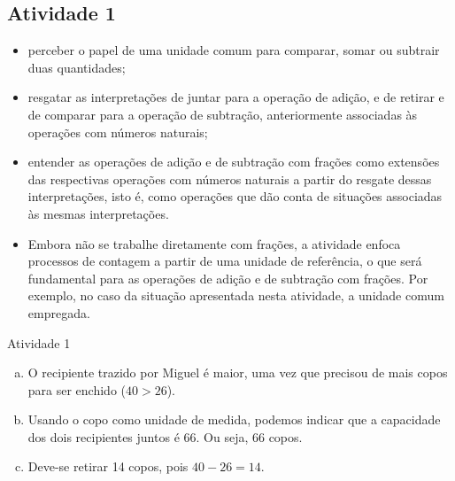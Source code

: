   \begin{multicols}{2}

\subsection{Atividade 1}

\vspace{.15cm}

\begin{itemize} %
  \item     perceber o papel de uma unidade comum para comparar, somar ou subtrair duas quantidades;
  \item     resgatar as interpretações de juntar para a operação de adição, e de retirar e de comparar para a operação de subtração, anteriormente associadas às operações com números naturais;
  \item     entender as operações de adição e de subtração com frações como extensões das respectivas operações com números naturais a partir do resgate dessas interpretações, isto é, como operações que dão conta de situações associadas às mesmas interpretações.
\end{itemize} %


 \vspace{.15cm}
\begin{itemize} %
  \item     Embora não se trabalhe diretamente com frações, a atividade enfoca processos de contagem a partir de uma unidade de referência, o que será fundamental para as operações de adição e de subtração com frações. Por exemplo, no caso da situação apresentada nesta atividade, a unidade comum empregada.
\end{itemize} %

\begin{resposta*}{Atividade 1}
 \begin{enumerate}[a)]
  \item O recipiente trazido por Miguel é maior, uma vez que precisou de mais copos para ser enchido ($40>26$).
  \item Usando o copo como unidade de medida, podemos indicar que a capacidade dos dois recipientes juntos é 66. Ou seja, 66 copos.
  \item Deve-se retirar 14 copos, pois $40 - 26=14$.
 \end{enumerate}


\end{resposta*}
\end{multicols}

